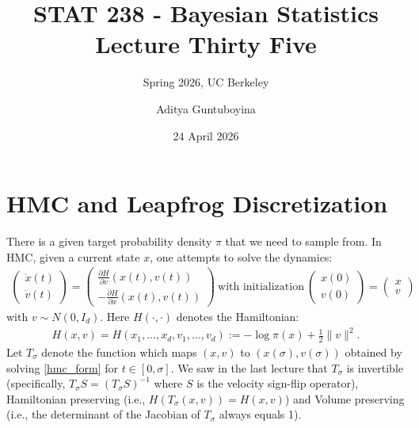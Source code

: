 \documentclass{scrartcl}
\begin{document}
\title{STAT 238 - Bayesian Statistics  \\
  Lecture Thirty Five} 
\subtitle{Spring 2026, UC Berkeley}

\author{Aditya Guntuboyina}


\date{24 April 2026}

\maketitle

\section{HMC and Leapfrog Discretization}

There is a given target probability density $\pi$ that we need to
sample from. In HMC, given a current state $x$, one attempts to solve the
dynamics:
\begin{align}\label{hmc_form}
    \begin{pmatrix}
    \dot{x}(t) \\ \dot{v}(t)
  \end{pmatrix} =
  \begin{pmatrix}
    \frac{\partial H}{\partial v}(x(t), v(t)) \\ -\frac{\partial
    H}{\partial x}(x(t), v(t))
  \end{pmatrix} ~\text{with initialization}~
  \begin{pmatrix}
    x(0) \\ v(0)
  \end{pmatrix} =
  \begin{pmatrix}
    x \\ v
  \end{pmatrix}
\end{align}
with $v \sim N(0, I_d)$. Here $H(\cdot, \cdot)$ denotes the
Hamiltonian:
\begin{align}\label{hamiltonian}
  H(x, v) = H(x_1, \dots, x_d, v_1, \dots, v_d) := -\log \pi(x) +
  \frac{1}{2}\|v\|^2. 
\end{align}
Let $T_{\sigma}$ denote the function which maps $(x, v)$ to
$(x(\sigma), v(\sigma))$ obtained by solving \eqref{hmc_form} for $t
\in [0, \sigma]$. We saw in the last lecture that $T_{\sigma}$ is
invertible (specifically, $T_{\sigma} S = (T_{\sigma} S)^{-1}$ where
$S$ is the velocity sign-flip operator), Hamiltonian preserving (i.e.,
$H(T_{\sigma}(x, v)) = H(x, v)$) and Volume preserving (i.e., the
determinant of the Jacobian of $T_{\sigma}$ always equals 1).
\end{document}
